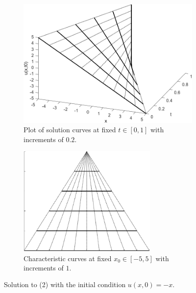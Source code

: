 \documentclass{myproject}
\begin{document}
\begin{figure}
    \centering
    \begin{subfigure}{.48\textwidth}
        \centering
        \includegraphics[width=1.0\textwidth]{intro_f2_3d.png}
        \caption{Plot of solution curves at fixed $t\in[0,1]$ with increments of $0.2$.}
        \label{fig:f2_3d}
    \end{subfigure}\hfill
    \begin{subfigure}{.48\textwidth}
        \centering
        \includegraphics[width=0.75\textwidth]{intro_f2_char.png}
        \caption{Characteristic curves at fixed $x_0 \in [-5, 5]$ with increments of $1$.}
        \label{fig:f2_char}
    \end{subfigure}
    \caption{Solution to (2) with the initial condition $u(x,0) = -x$.}
    \label{fig:f2}
\end{figure}
\end{document}
